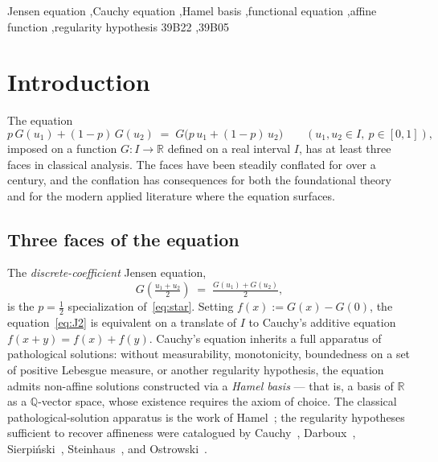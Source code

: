 \documentclass[review,12pt,a4paper]{elsarticle}
\theoremstyle{remark}
\newcommand{\R}{\mathbb R}
\newcommand{\Q}{\mathbb Q}
\begin{document}
\begin{frontmatter}
\begin{keyword}
Jensen equation \sep Cauchy equation \sep Hamel basis \sep functional equation \sep affine function \sep regularity hypothesis
\MSC[2020] 39B22 \sep 39B05
\end{keyword}

\end{frontmatter}

\section{Introduction}
\label{sec:intro}

The equation
\begin{equation}
p\,G(u_1)+(1-p)\,G(u_2) \;=\; G\bigl(p\,u_1+(1-p)\,u_2\bigr)
\qquad (u_1,u_2\in I,\ p\in[0,1]),
\tag{$\star$}\label{eq:star}
\end{equation}
imposed on a function $G\colon I\to\R$ defined on a real interval $I$, has
at least three faces in classical analysis. The faces have been steadily
conflated for over a century, and the conflation has consequences for both
the foundational theory and for the modern applied literature where the
equation surfaces.

\subsection{Three faces of the equation}

The \emph{discrete-coefficient} Jensen equation,
\begin{equation}
G\!\left(\tfrac{u_1+u_2}{2}\right) \;=\; \tfrac{G(u_1)+G(u_2)}{2},
\tag{$J_2$}\label{eq:J2}
\end{equation}
is the $p=\tfrac12$ specialization of~\eqref{eq:star}. Setting
$f(x):=G(x)-G(0)$, the equation~\eqref{eq:J2} is equivalent on a translate
of $I$ to Cauchy's additive equation $f(x+y)=f(x)+f(y)$. Cauchy's equation
inherits a full apparatus of pathological solutions: without measurability,
monotonicity, boundedness on a set of positive Lebesgue measure, or
another regularity hypothesis, the equation admits non-affine solutions
constructed via a \emph{Hamel basis} --- that is, a basis of $\R$ as a
$\Q$-vector space, whose existence requires the axiom of choice. The
classical pathological-solution apparatus is the work of
Hamel~\cite{Hamel1905}; the regularity hypotheses sufficient to recover
affineness were catalogued by Cauchy~\cite{Cauchy1821},
Darboux~\cite{Darboux1875}, Sierpi\'nski~\cite{Sierpinski1920},
Steinhaus~\cite{Steinhaus1920}, and Ostrowski~\cite{Ostrowski1929}.
\end{document}
